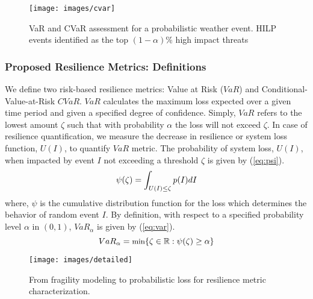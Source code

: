 \documentclass[12pt]{article}
\begin{document}
\begin{figure}[h]
  \centering
  \texttt{[image: images/cvar]}
  \vspace{-0.5 cm}
  \caption{\small VaR and CVaR assessment for a probabilistic weather event. HILP events identified as the top $(1-\alpha)\%$ high impact threats}
 \label{fig:cvar}
\end{figure}

\subsubsection{Proposed Resilience Metrics: Definitions} 
We define two risk-based resilience metrics: Value at Risk ($VaR$) and Conditional-Value-at-Risk $CVaR$. $VaR$ calculates the maximum loss expected over a given time period and given a specified degree of confidence. Simply, $VaR$ refers to the lowest amount $\zeta$ such that with probability $\alpha$ the loss will not exceed $\zeta$. In case of resilience quantification, we measure the decrease in resilience or system loss function, $U(I)$, to quantify $VaR$ metric. 
The probability of system loss, $U(I)$, when impacted by event $I$ not exceeding a threshold $\zeta$ is given by (\ref{eq:psi}).
\begin{equation}\label{eq:psi}
\small
    \psi(\zeta)=\int_{U(I)\leq \zeta }^{} p(I) dI
\end{equation}
where, $\psi$ is the cumulative distribution function for the loss which determines the behavior of random event $I$. 
By definition, with respect to a specified probability level $\alpha$ in $(0,1)$, $VaR_{\alpha}$ is given by (\ref{eq:var}).
\begin{equation}\label{eq:var}
\small
        VaR_{\alpha}= \text{min}\{\zeta \in \mathbb{R}:\psi(\zeta)\geq \alpha\}
\end{equation}

\begin{figure}[t]
    \centering
    \texttt{[image: images/detailed]}
    \caption{\small From fragility modeling to probabilistic loss for resilience metric characterization.}
\label{fig:det}
\end{figure}
\end{document}

